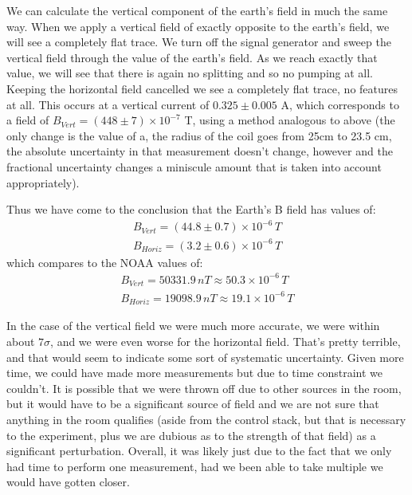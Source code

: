 \documentclass{article}
\begin{document}
    We can calculate the vertical component of the earth's field in much the same way.  When we apply a vertical field of exactly opposite to the earth's field, we will see a completely flat trace.  We turn off the signal generator and sweep the vertical field through the value of the earth's field.  As we reach exactly that value, we will see that there is again no splitting and so no pumping at all.  Keeping the horizontal field cancelled we see a completely flat trace, no features at all.  This occurs at a vertical current of $0.325 \pm 0.005$ A, which corresponds to a field of $B_{Vert} = (448 \pm 7) \times 10^{-7}$ T, using a method analogous to above (the only change is the value of a, the radius of the coil goes from 25cm to 23.5 cm, the absolute uncertainty in that measurement doesn't change, however and the fractional uncertainty changes a miniscule amount that is taken into account appropriately).

    \hspace{.25cm}

    Thus we have come to the conclusion that the Earth's B field has values of:
    \begin{gather*}
      B_{Vert} = (44.8 \pm 0.7) \times 10^{-6} \, T \\
      B_{Horiz} = (3.2 \pm 0.6) \times 10^{-6} \, T
    \end{gather*}
    which compares to the NOAA \cite{NOAA} values of:
    \begin{gather*}
      B_{Vert} = 50331.9 \, nT \approx 50.3 \times 10^{-6} \, T \\
      B_{Horiz} = 19098.9 \, nT \approx 19.1 \times 10^{-6} \, T
    \end{gather*}

    In the case of the vertical field we were much more accurate, we were within about $7\sigma$, and we were even worse for the horizontal field.  That's pretty terrible, and that would seem to indicate some sort of systematic uncertainty.  Given more time, we could have made more measurements but due to time constraint we couldn't.  It is possible that we were thrown off due to other sources in the room, but it would have to be a significant source of field and we are not sure that anything in the room qualifies (aside from the control stack, but that is necessary to the experiment, plus we are dubious as to the strength of that field) as a significant perturbation.  Overall, it was likely just due to the fact that we only had time to perform one measurement, had we been able to take multiple we would have gotten closer.
\end{document}
